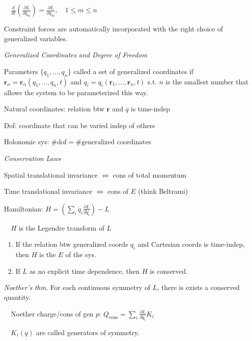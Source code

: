 \documentclass[twocolumn]{article}
\begin{document}
$\quad \frac{d}{dt} \left( \frac{\partial L}{\partial \dot{q}_m} \right) = \frac{\partial L}{\partial q_m}, \quad 1 \leq m \leq n$

Constraint forces are automatically incorporated with the right choice of generalized variables.

\vspace{-.5em}
\dotfill

\textit{Generalized Coordinates and Degree of Freedom}

Parameters $\{ q_1, \dots, q_n \}$ called a set of generalized coordinates if $\mathbf{r}_\alpha = \mathbf{r}_\alpha(q_1, \dots, q_n, t)$ and $q_i = q_i (\mathbf{r}_1, \dots, \mathbf{r}_n, t)$ s.t. $n$ is the smallest number that allows the system to be parameterized this way.

Natural coordinates: relation btw $\mathbf{r}$ and $q$ is time-indep

Dof: coordinate that can be varied indep of others

Holonomic sys: $\# \text{dof} = \# \text{generalized coordinates}$

\vspace{-.5em}
\dotfill

\textit{Conservation Laws}

Spatial translational invariance $\iff$ cons of total momentum

Time translational invariance $\iff$ cons of $E$ \hfill (think Beltrami)

Hamiltonian: $H = \left( \sum_i \dot{q}_i \frac{\partial L}{\partial \dot{q}_i} \right) - L$

$\quad H$ is the Legendre transform of $L$


\cleardoublepage


\begin{enumerate}
    \item If the relation btw generalized coords $q_i$ and Cartesian coords is time-indep, then $H$ is the $E$ of the sys.
    \item If $L$ as no explicit time dependence, then $H$ is conserved.
\end{enumerate} \vspace{-.5em}

\textit{Noether's thm}. For each continuous symmetry of $L$, there is exists a conserved quantity.

$\quad$Noether charge/cons of gen $p$: $Q_{\text{cons}} = \sum_i \frac{\partial L}{\partial \dot{q}_i} K_i$

$\quad K_i(q)$ are called generators of symmetry.
\end{document}
